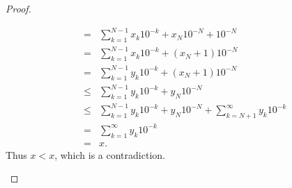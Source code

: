 \begin{proof}
\begin{enumerate}
\begin{eqnarray*}
            & = & \sum_{k=1}^{N-1} x_k 10^{-k} + x_N 10^{-N} + 10^{-N}\\
            & = & \sum_{k=1}^{N-1} x_k 10^{-k} + (x_N +1) 10^{-N}\\
            & = & \sum_{k=1}^{N-1} y_k 10^{-k} + (x_N +1) 10^{-N}\\
            & \leq & \sum_{k=1}^{N-1} y_k 10^{-k} + y_N 10^{-N}\\
            & \leq & \sum_{k=1}^{N-1} y_k 10^{-k} + y_N 10^{-N} + \sum_{k=N+1}^\infty y_k 10^{-k}\\
            & = & \sum_{k=1}^\infty y_k 10^{-k}\\
            & = & x.
        \end{eqnarray*}
        Thus $x<x$, which is a contradiction.
    \end{enumerate}
\end{proof}

